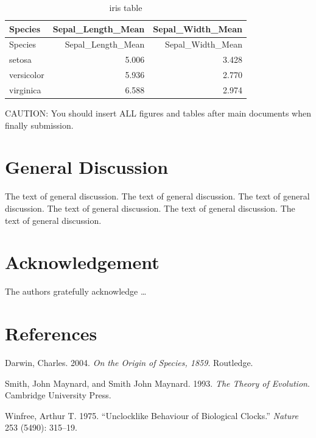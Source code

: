 \documentclass[12pt, a4paper]{report} %
\newlength{\cslhangindent}
\newenvironment{CSLReferences}[2] %
 {%
  \setlength{\parindent}{0pt}
  \ifodd #1 \everypar{\setlength{\hangindent}{\cslhangindent}}\ignorespaces\fi
  \ifnum #2 > 0
  \setlength{\parskip}{#2\baselineskip}
  \fi
 }%
 {}
\begin{document}
\clearpage

\begin{longtable}[]{@{}lrr@{}}
\caption{iris table}\tabularnewline
\toprule
Species & Sepal\_Length\_Mean & Sepal\_Width\_Mean \\
\midrule
\endfirsthead
\toprule
Species & Sepal\_Length\_Mean & Sepal\_Width\_Mean \\
\midrule
\endhead
setosa & 5.006 & 3.428 \\
versicolor & 5.936 & 2.770 \\
virginica & 6.588 & 2.974 \\
\bottomrule
\end{longtable}

CAUTION: You should insert ALL figures and tables after main documents
when finally submission.

\chapter*{General Discussion}
\parindent=5.3mm

The text of general discussion. The text of general discussion. The text
of general discussion. The text of general discussion. The text of
general discussion. The text of general discussion.

\chapter*{Acknowledgement}

The authors gratefully acknowledge \ldots{}

\chapter*{References}

\hypertarget{refs}{}
\begin{CSLReferences}{1}{0}
\leavevmode{}%
Darwin, Charles. 2004. \emph{On the Origin of Species, 1859}. Routledge.

\leavevmode{}%
Smith, John Maynard, and Smith John Maynard. 1993. \emph{The Theory of
Evolution}. Cambridge University Press.

\leavevmode{}%
Winfree, Arthur T. 1975. {``Unclocklike Behaviour of Biological
Clocks.''} \emph{Nature} 253 (5490): 315--19.

\end{CSLReferences}



\end{document}

